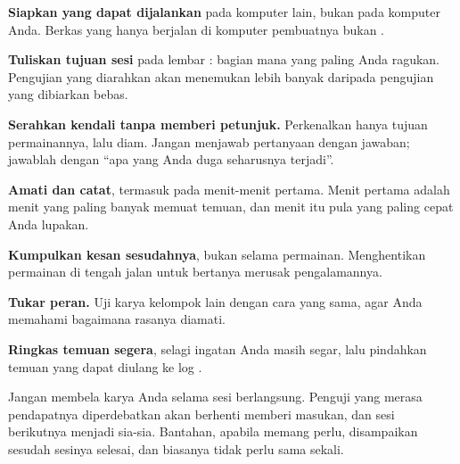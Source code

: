 \begin{langkah}
  \item \textbf{Siapkan  yang dapat dijalankan} pada komputer
        lain, bukan pada komputer Anda. Berkas yang hanya berjalan di komputer
        pembuatnya bukan .
  \item \textbf{Tuliskan tujuan sesi} pada lembar : bagian
        mana yang paling Anda ragukan. Pengujian yang diarahkan akan
        menemukan lebih banyak daripada pengujian yang dibiarkan bebas.
  \item \textbf{Serahkan kendali tanpa memberi petunjuk.} Perkenalkan hanya
        tujuan permainannya, lalu diam. Jangan menjawab pertanyaan dengan
        jawaban; jawablah dengan ``apa yang Anda duga seharusnya terjadi''.
  \item \textbf{Amati dan catat}, termasuk pada menit-menit pertama. Menit
        pertama adalah menit yang paling banyak memuat temuan, dan menit itu
        pula yang paling cepat Anda lupakan.
  \item \textbf{Kumpulkan kesan sesudahnya}, bukan selama permainan.
        Menghentikan permainan di tengah jalan untuk bertanya merusak
        pengalamannya.
  \item \textbf{Tukar peran.} Uji karya kelompok lain dengan cara yang sama,
        agar Anda memahami bagaimana rasanya diamati.
  \item \textbf{Ringkas temuan segera}, selagi ingatan Anda masih segar, lalu
        pindahkan temuan yang dapat diulang ke log .
\end{langkah}

\begin{peringatanbox}
Jangan membela karya Anda selama sesi berlangsung. Penguji yang merasa
pendapatnya diperdebatkan akan berhenti memberi masukan, dan sesi berikutnya
menjadi sia-sia. Bantahan, apabila memang perlu, disampaikan sesudah sesinya
selesai, dan biasanya tidak perlu sama sekali.
\end{peringatanbox}
